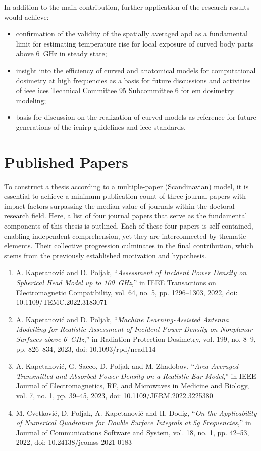 In addition to the main contribution, further application of the research results would achieve:
\begin{itemize}
    \item confirmation of the validity of the spatially averaged \gls{apd} as a fundamental limit for estimating temperature rise for local exposure of curved body parts above \SI{6}{\GHz} in steady state;
    \item insight into the efficiency of curved and anatomical models for computational dosimetry at high frequencies as a basis for future discussions and activities of \gls{ieee} \gls{ices} Technical Committee 95 Subcommittee 6 for \gls{em} dosimetry modeling;
    \item basis for discussion on the realization of curved models as reference for future generations of the \gls{icnirp} guidelines and \gls{ieee} standards.
\end{itemize}

\section{Published Papers}
\label{sec:published_papers}
To construct a thesis according to a multiple-paper (Scandinavian) model, it is essential to achieve a minimum publication count of three journal papers with impact factors surpassing the median value of journals within the doctoral research field.
Here, a list of four journal papers that serve as the fundamental components of this thesis is outlined.
Each of these four papers is self-contained, enabling independent comprehension, yet they are interconnected by thematic elements.
Their collective progression culminates in the final contribution, which stems from the previously established motivation and hypothesis.

\begin{enumerate}
    \item A. Kapetanović and D. Poljak, ``\textit{Assessment of Incident Power Density on Spherical Head Model up to \SI{100}{\GHz}},'' in IEEE Transactions on Electromagnetic Compatibility, vol. 64, no. 5, pp. 1296--1303, 2022, doi: 10.1109/TEMC.2022.3183071
    \item A. Kapetanović and D. Poljak, ``\textit{Machine Learning-Assisted Antenna Modelling for Realistic Assessment of Incident Power Density on Nonplanar Surfaces above \SI{6}{\GHz}},'' in Radiation Protection Dosimetry, vol. 199, no. 8--9, pp. 826--834, 2023, doi: 10.1093/rpd/ncad114
    \item A. Kapetanović, G. Sacco, D. Poljak and M. Zhadobov, ``\textit{Area-Averaged Transmitted and Absorbed Power Density on a Realistic Ear Model},'' in IEEE Journal of Electromagnetics, RF, and Microwaves in Medicine and Biology, vol. 7, no. 1, pp. 39--45, 2023, doi: 10.1109/JERM.2022.3225380
    \item M. Cvetković, D. Poljak, A. Kapetanović and H. Dodig, ``\textit{On the Applicability of Numerical Quadrature for Double Surface Integrals at \gls{5g} Frequencies},'' in Journal of Communications Software and System, vol. 18, no. 1, pp. 42--53, 2022, doi: 10.24138/jcomss-2021-0183
\end{enumerate}

